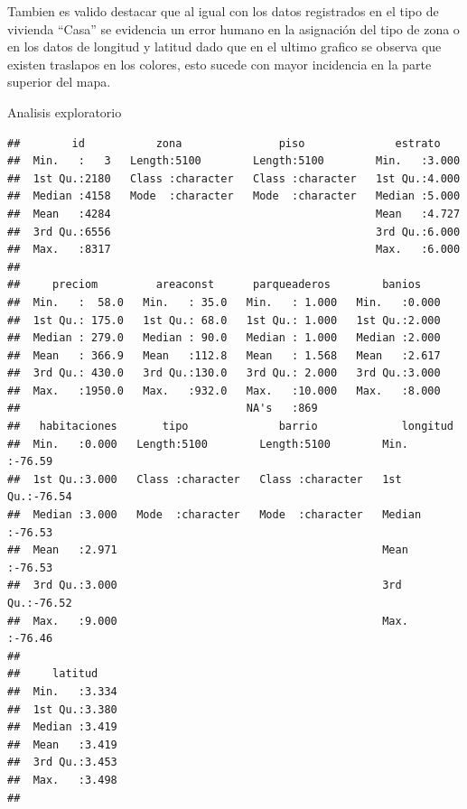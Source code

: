 \documentclass[
]{article}
\begin{document}
Tambien es valido destacar que al igual con los datos registrados en el
tipo de vivienda ``Casa'' se evidencia un error humano en la asignación
del tipo de zona o en los datos de longitud y latitud dado que en el
ultimo grafico se observa que existen traslapos en los colores, esto
sucede con mayor incidencia en la parte superior del mapa.

Analisis exploratorio

\begin{verbatim}
##        id           zona               piso              estrato     
##  Min.   :   3   Length:5100        Length:5100        Min.   :3.000  
##  1st Qu.:2180   Class :character   Class :character   1st Qu.:4.000  
##  Median :4158   Mode  :character   Mode  :character   Median :5.000  
##  Mean   :4284                                         Mean   :4.727  
##  3rd Qu.:6556                                         3rd Qu.:6.000  
##  Max.   :8317                                         Max.   :6.000  
##                                                                      
##     preciom         areaconst      parqueaderos        banios     
##  Min.   :  58.0   Min.   : 35.0   Min.   : 1.000   Min.   :0.000  
##  1st Qu.: 175.0   1st Qu.: 68.0   1st Qu.: 1.000   1st Qu.:2.000  
##  Median : 279.0   Median : 90.0   Median : 1.000   Median :2.000  
##  Mean   : 366.9   Mean   :112.8   Mean   : 1.568   Mean   :2.617  
##  3rd Qu.: 430.0   3rd Qu.:130.0   3rd Qu.: 2.000   3rd Qu.:3.000  
##  Max.   :1950.0   Max.   :932.0   Max.   :10.000   Max.   :8.000  
##                                   NA's   :869                     
##   habitaciones       tipo              barrio             longitud     
##  Min.   :0.000   Length:5100        Length:5100        Min.   :-76.59  
##  1st Qu.:3.000   Class :character   Class :character   1st Qu.:-76.54  
##  Median :3.000   Mode  :character   Mode  :character   Median :-76.53  
##  Mean   :2.971                                         Mean   :-76.53  
##  3rd Qu.:3.000                                         3rd Qu.:-76.52  
##  Max.   :9.000                                         Max.   :-76.46  
##                                                                        
##     latitud     
##  Min.   :3.334  
##  1st Qu.:3.380  
##  Median :3.419  
##  Mean   :3.419  
##  3rd Qu.:3.453  
##  Max.   :3.498  
## 
\end{verbatim}
\end{document}
